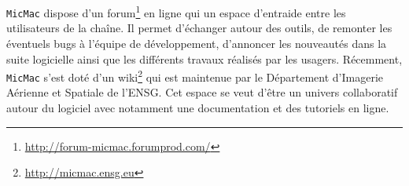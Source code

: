 {\tt MicMac} dispose d'un forum\footnote{\url{http://forum-micmac.forumprod.com/}} en ligne qui un espace d'entraide entre les utilisateurs de la chaîne. Il permet d'échanger autour des outils, de remonter les éventuels bugs à l'équipe de développement, d'annoncer les nouveautés dans la suite logicielle ainsi que les différents travaux réalisés par les usagers. Récemment, {\tt MicMac} s'est doté d'un wiki\footnote{\url{http://micmac.ensg.eu}} qui est maintenue par le Département d'Imagerie Aérienne et Spatiale de l'ENSG. Cet espace se veut d'être un univers collaboratif autour du logiciel avec notamment une documentation et des tutoriels en ligne. 